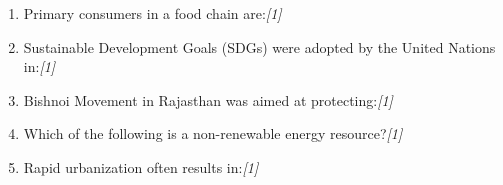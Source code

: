 \documentclass[11pt,a4paper]{article}
\newcommand{\pts}[1]{\hfill   \textit{[#1]}}
\begin{document}
\begin{enumerate}[label=   \textbf{Question \arabic*.}]
    \medskip

    \item Primary consumers in a food chain are:\pts{1}
    

    \medskip

    \item Sustainable Development Goals (SDGs) were adopted by the United Nations in:\pts{1}
    

    \medskip

    \item Bishnoi Movement in Rajasthan was aimed at protecting:\pts{1}
    

    \medskip

    \item Which of the following is a non-renewable energy resource?\pts{1}
    

    \medskip

    \item Rapid urbanization often results in:\pts{1}
    

\end{enumerate}
\end{document}
